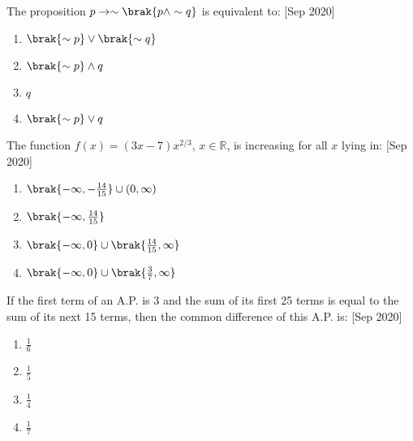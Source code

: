     \item The proposition $ p \to \sim\brak{p \land \sim q} $ is equivalent to:
    \hfill{[Sep 2020]}
    \begin{enumerate}
        \item $ \brak{\sim p} \lor \brak{\sim q} $
        \item $ \brak{\sim p} \land q $
        \item $ q $
        \item $ \brak{\sim p} \lor q $
    \end{enumerate}

    \item The function $ f(x) = (3x - 7)x^{2/3} $, $ x \in \mathbb{R} $, is increasing for all $ x $ lying in:
    \hfill{[Sep 2020]}
    \begin{enumerate}
        \item $ \brak{ -\infty, -\frac{14}{15} } \cup (0, \infty) $
        \item $ \brak{ -\infty, \frac{14}{15} } $
        \item $ \brak{ -\infty, 0 } \cup \brak{ \frac{14}{15}, \infty } $
        \item $ \brak{ -\infty, 0} \cup \brak{ \frac{3}{7}, \infty } $
    \end{enumerate}

    \item If the first term of an A.P. is 3 and the sum of its first 25 terms is equal to the sum of its next 15 terms, then the common difference of this A.P. is:
    \hfill{[Sep 2020]}
    \begin{enumerate}
        \item $ \frac{1}{6} $
        \item $ \frac{1}{5} $
        \item $ \frac{1}{4} $
        \item $ \frac{1}{7} $
    \end{enumerate}




